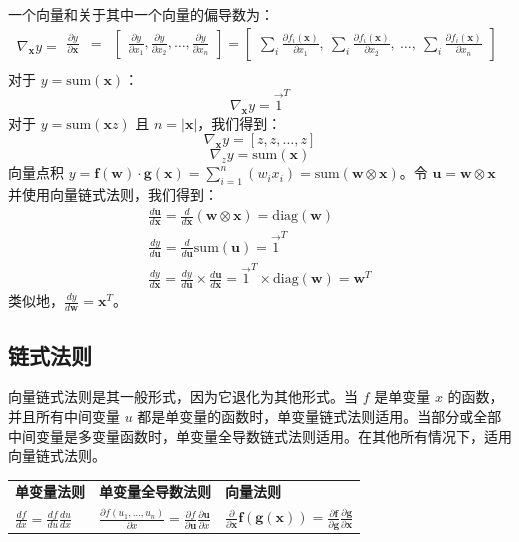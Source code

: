 \documentclass[11pt]{article}
\begin{document}
一个向量和关于其中一个向量的偏导数为：
\[
\nabla_{\mathbf{x}} y = \begin{array}{lcl}
 \frac{\partial y}{\partial \mathbf{x}} & = & \begin{bmatrix} \frac{\partial y}{\partial x_1}, \frac{\partial y}{\partial x_2}, \ldots, \frac{\partial y}{\partial x_n} \end{bmatrix} = \begin{bmatrix} \sum_i \frac{\partial f_i(\mathbf{x})}{\partial x_1},~ \sum_i \frac{\partial f_i(\mathbf{x})}{\partial x_2},~ \ldots,~ \sum_i \frac{\partial f_i(\mathbf{x})}{\partial x_n}  \end{bmatrix}\\
\end{array}
\]
对于 $y = \text{sum}(\mathbf{x})$：
\[\nabla_\mathbf{x} y = \vec{1}^T\]
对于 $y = \text{sum}(\mathbf{x}z)$ 且 $n = |\mathbf{x}|$，我们得到：
\[\nabla_\mathbf{x} y = [z, z, \ldots, z]\]
\[\nabla_z y = \text{sum}(\mathbf{x}) \]
向量点积 $y = \mathbf{f(w)} \cdot \mathbf{g(x)} = \sum_{i=1}^n (w_i x_i) = \text{sum}(\mathbf{w} \otimes \mathbf{x})$。令 $\mathbf{u} = \mathbf{w} \otimes \mathbf{x}$ 并使用向量链式法则，我们得到：
\[
\begin{array}{lcl}
 \frac{d \mathbf{u}}{d\mathbf{x}} = \frac{d}{d\mathbf{x}} (\mathbf{w} \otimes \mathbf{x}) = \text{diag}(\mathbf{w})\\
 \frac{dy}{d\mathbf{u}} = \frac{d}{d\mathbf{u}} \text{sum}(\mathbf{u}) = \vec{1}^T\\
 \frac{dy}{d\mathbf{x}} = \frac{dy}{d\mathbf{u}} \times \frac{d\mathbf{u}}{d\mathbf{x}} = \vec{1}^T \times \text{diag}(\mathbf{w}) = \mathbf{w}^T
\end{array}
\]
类似地，$\frac{dy}{d\mathbf{w}} = \mathbf{x}^T$。

\subsection{链式法则}\label{sec8.5}

向量链式法则是其一般形式，因为它退化为其他形式。当 $f$ 是单变量 $x$ 的函数，并且所有中间变量 $u$ 都是单变量的函数时，单变量链式法则适用。当部分或全部中间变量是多变量函数时，单变量全导数链式法则适用。在其他所有情况下，适用向量链式法则。

\begin{tabular}{lll}
{\bf 单变量法则} & {\bf 单变量全导数法则} & {\bf 向量法则} \\
$\frac{df}{dx} = \frac{df}{du}\frac{du}{dx}$ & $\frac{\partial f(u_1,\ldots,u_n)}{\partial x} = \frac{\partial f}{\partial \mathbf{u}} \frac{\partial \mathbf{u}}{\partial x}$ & $\frac{\partial}{\partial \mathbf{x}} \mathbf{f}(\mathbf{g}(\mathbf{x})) = \frac{\partial \mathbf{f}}{\partial \mathbf{g}}\frac{\partial\mathbf{g}}{\partial \mathbf{x}}$ \\
\end{tabular}
\end{document}
